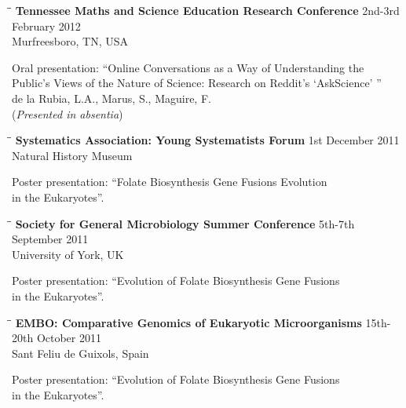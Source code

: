 \documentclass{res}
\begin{document}
\begin{resume}
   
   \vspace{-0.1in}
    \begin{tabbing}
   \hspace{2in}\= \hspace{2.6in}\= \kill 
    {\bf Tennessee Maths and Science Education Research Conference} \>  \> 2nd-3rd February 2012\\
                        \>     \> Murfreesboro, TN, USA
   \end{tabbing}
   
  \vspace{-30pt}     
Oral presentation: ``Online Conversations as a Way of Understanding the \\Public's Views of the Nature of Science: Research on Reddit's `AskScience' '' 
 \\ de la Rubia, L.A., Marus, S., Maguire, F. \\
 (\emph{Presented in absentia})
  \vspace{-0.1in}
  
  \begin{tabbing}
   \hspace{2in}\= \hspace{2.6in}\= \kill 
    {\bf Systematics Association: Young Systematists Forum} \>  \> 1st December 2011\\
                        \>     \> Natural History Museum
   \end{tabbing}\vspace{-20pt}      
   
   Poster presentation: ``Folate Biosynthesis Gene Fusions Evolution \\in the Eukaryotes''.
    \vspace{-0.1in}  
    \begin{tabbing}
   \hspace{2in}\= \hspace{2.6in}\= \kill 
    {\bf Society for General Microbiology Summer Conference} \> \>5th-7th September 2011\\
                          \>   \> University of York, UK

   \end{tabbing}\vspace{-20pt}      
      Poster presentation: ``Evolution of Folate Biosynthesis Gene Fusions \\in the Eukaryotes''.
      
  
  \vspace{-0.1in}
     \begin{tabbing} 
   \hspace{2in}\= \hspace{2.6in}\= \kill 
    {\bf EMBO: Comparative Genomics of Eukaryotic Microorganisms}
    \>  \> 15th-20th October 2011\\
                         \>    \> Sant Feliu de Guixols, Spain
   \end{tabbing}\vspace{-20pt}      
      Poster presentation: ``Evolution of Folate Biosynthesis Gene Fusions \\in the Eukaryotes''.


\end{resume}
\end{document}
